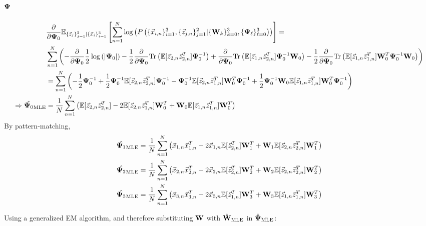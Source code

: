 \subsection{$\bold{\Psi}$}


\begin{align*}
  &\frac{\partial}{\partial \bold{\Psi}_0} \mathbb{E}_{\{ \vec{z}_j\}_{j=1}^2 | \{\vec{x}_i\}_{i=1}^3} \left[ \sum_{n=1}^N \log \left( P \left( \{\vec{x}_{i,n}\}_{i=1}^3,\{ \vec{z}_{j,n}\}_{j=1}^2| \{\bold{W}_k\}_{k=0}^3, \{\bold{\Psi}_{\ell}\}_{\ell=0}^3 \right) \right) \right] = \\
  & \sum_{n=1}^N \left( - \frac{\partial}{\partial \bold{\Psi}_0}  \frac{1}{2} \log \left( \left|
    \bold{\Psi}_0 \right| \right) - \frac{1}{2} \frac{\partial}{\partial
    \bold{\Psi}_0}\mathrm{Tr} \left( \mathbb{E} [\vec{z}_{2,n} \vec{z}_{2,n}^T] \bold{\Psi}_0^{-1} \right)  +
    \frac{\partial}{\partial \bold{\Psi}_0} \mathrm{Tr} \left( \mathbb{E} [\vec{z}_{1,n} \vec{z}_{2,n}^T ]
    \bold{\Psi}_0^{-1} \bold{W}_0 \right) - \frac{1}{2} \frac{\partial}{\partial \bold{\Psi}_0} \mathrm{Tr}
    \left( \mathbb{E} [\vec{z}_{1,n} \vec{z}_{1,n}^T] \bold{W}_0^T \bold{\Psi}_0^{-1} \bold{W}_0 \right) \right) \\
    &=\sum_{n=1}^N \left( -\frac{1}{2} \bold{\Psi}_0^{-1}  + \frac{1}{2} \bold{\Psi}_0^{-1} \mathbb{E}[\vec{z}_{2,n} \vec{z}_{2,n}^T] \bold{\Psi}_0^{-1} - \bold{\Psi}_0^{-1} \mathbb{E}[\vec{z}_{2,n} \vec{z}_{1,n}^T] \bold{W}_0^T
      \bold{\Psi}_0^{-1} + \frac{1}{2} \bold{\Psi}_0^{-1} \bold{W}_0 \mathbb{E} [\vec{z}_{1,n} \vec{z}_{1,n}^T ] \bold{W}_0^T
      \bold{\Psi}_0^{-1}\right) \\
  \Rightarrow \hat{\bold{\Psi}_0}_{\text{MLE}} &= \frac{1}{N}  \sum_{n=1}^N \left( \mathbb{E}[ \vec{z}_{2,n} \vec{z}_{2,n}^T] - 2 \mathbb{E} [\vec{z}_{2,n} \vec{z}_{1,n}^T] \bold{W}_0^T +  \bold{W}_0 \mathbb{E}[\vec{z}_{1,n}
    \vec{z}_{1,n}^T] \bold{W}_0^T       \right)
\end{align*}
By pattern-matching, 
\begin{align*}
 \hat{\bold{\Psi}_1}_{\text{MLE}} &=  \frac{1}{N}  \sum_{n=1}^N \left( \vec{x}_{1,n} \vec{x}_{1,n}^T - 2 \vec{x}_{1,n}
                                        \mathbb{E}[\vec{z}_{2,n}^T] \bold{W}_1^T +  \bold{W}_1 \mathbb{E}[\vec{z}_{2,n}
                                \vec{z}_{2,n}^T] \bold{W}_1^T      \right) \\
 \hat{\bold{\Psi}_2}_{\text{MLE}} &= \frac{1}{N}  \sum_{n=1}^N \left( \vec{x}_{2,n} \vec{x}_{2,n}^T - 2 \vec{x}_{2,n}
                                           \mathbb{E}[\vec{z}_{2,n}^T] \bold{W}_2^T +  \bold{W}_2 \mathbb{E}[\vec{z}_{2,n}
                                  \vec{z}_{2,n}^T] \bold{W}_2^T       \right) \\
 \hat{\bold{\Psi}_3}_{\text{MLE}} &=  \frac{1}{N}  \sum_{n=1}^N \left( \vec{x}_{3,n} \vec{x}_{3,n}^T - 2 \vec{x}_{3,n} \mathbb{E}[\vec{z}_{1,n}^T] \bold{W}_3^T + \bold{W}_3 \mathbb{E}[\vec{z}_{1,n}
    \vec{z}_{1,n}^T] \bold{W}_3^T      \right) \\
\end{align*}

Using a generalized EM algorithm, and therefore substituting $\bold{W}$ with
$\hat{\bold{W}}_{\text{MLE}}$ in $\hat{\bold{\Psi}}_{\text{MLE}}$:


